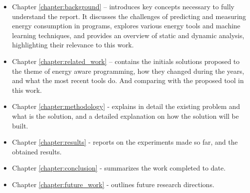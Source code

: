 \begin{itemize}
\item Chapter \ref{chapter:background} – introduces key concepts necessary to fully understand the report. It discusses the challenges of predicting and measuring energy consumption in programs, explores various energy tools and machine learning techniques, and provides an overview of static and dynamic analysis, highlighting their relevance to this work.

\item Chapter \ref{chapter:related_work} – contains the initials solutions proposed to the theme of energy aware programming, how they changed during the years, and what the most recent tools do. And comparing with the proposed tool in this work.

\item Chapter \ref{chapter:methodology} - explains in detail the existing problem and what is the solution, and a detailed explanation on how the solution will be built.

\item Chapter \ref{chapter:results} - reports on the experiments made so far, and the obtained results.

\item Chapter \ref{chapter:conclusion} - summarizes the work completed to date.

\item Chapter \ref{chapter:future_work} - outlines future research directions.

\end{itemize}